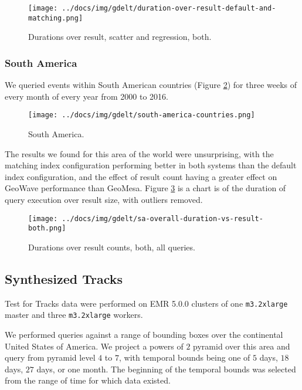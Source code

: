 \begin{figure}[h!tb]
  \centering
  \texttt{[image: ../docs/img/gdelt/duration-over-result-default-and-matching.png]}
  \caption{Durations over result, scatter and regression, both.}
  \label{durationresult}
\end{figure}

\subsubsection{South America}

We queried events within South American countries (Figure \ref{southamerica})
for three weeks of every month of every year from 2000 to 2016.

\begin{figure}[h!tb]
  \centering
  \texttt{[image: ../docs/img/gdelt/south-america-countries.png]}
  \caption{South America.}
  \label{southamerica}
\end{figure}

The results we found for this area of the world were unsurprising,
with the matching index configuration performing better in both systems than the default index configuration,
and the effect of result count having a greater effect on GeoWave performance than GeoMesa.
Figure \ref{sadurations} is a chart is of the duration of query execution over result size, with outliers removed.

\begin{figure}[h!tb]
  \centering
  \texttt{[image: ../docs/img/gdelt/sa-overall-duration-vs-result-both.png]}
  \caption{Durations over result counts, both, all queries.}
  \label{sadurations}
\end{figure}


\subsection{Synthesized Tracks}

Test for Tracks data were performed on EMR 5.0.0 clusters of one \texttt{m3.2xlarge} master and three \texttt{m3.2xlarge} workers.

We performed queries against a range of bounding boxes over the continental United States of America.
We project a powers of $2$ pyramid over this area and query from pyramid level $4$ to $7$,
with temporal bounds being one of $5$ days, $18$ days, $27$ days, or one month.
The beginning of the temporal bounds was selected from the range of time for which data existed.

